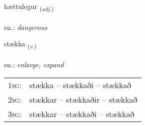 \documentclass[frontgrid, backgrid]{flacards}\usepackage[]{graphicx}\usepackage[]{xcolor}
\begin{document}
\renewcommand{\blhead}{\vskip5pt {\small\bfseries\footnotesize Lýsingarorð | Adjective }}
\renewcommand{\bcfoot}{\vskip5pt \hspace{2pt}{\small\bfseries\footnotesize 2K}}


{hættulegur \small{\textsubscript{(\textit{adj.})}} \\[1ex] %
\textphonetic{[haihtʏlɛɣʏr]} \\
en.: \emph{dangerous} \\  [2ex]
\renewcommand*{\arraystretch}{0.8}
}

\renewcommand{\flhead}{\vskip5pt \fboxsep=0pt {\small\bfseries\footnotesize Sagnorð | Verb}}
\renewcommand{\fcfoot}{\vskip5pt \fboxsep=0pt \hspace{2pt}{\small\bfseries\footnotesize 2K}}

\renewcommand{\blhead}{\vskip5pt {\small\bfseries\footnotesize Sagnorð | Verb }}
\renewcommand{\bcfoot}{\vskip5pt \hspace{2pt}{\small\bfseries\footnotesize 2K}}


{stækka \small{\textsubscript{(\textit{v.})}} \\[1ex] %
\textphonetic{[staihka]} \\
en.: \emph{enlarge, expand} \\  [2ex]
\renewcommand*{\arraystretch}{0.8}
\begin{tabular}{p{1cm}l}
\textsc{1sg}: & stækka -- stækkaði -- stækkað \\ 
\textsc{2sg}: & stækkar -- stækkaðir -- stækkað \\ 
\textsc{3sg}: & stækkar -- stækkaði -- stækkað \\ 
\end{tabular}
}
\end{document}
